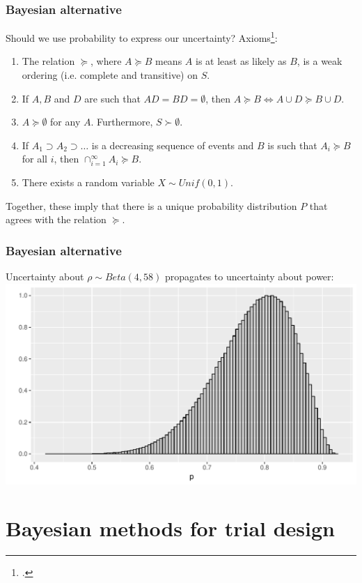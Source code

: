 \documentclass{beamer}
\begin{document}
\begin{frame}
\frametitle{Bayesian alternative}
Should we use probability to express our uncertainty? Axioms\footcite{DeGroot1970}:
\begin{enumerate}
\item The relation $\succeq$, where $A \succeq B$ means $A$ is at least as likely as $B$, is a weak ordering (i.e. complete and transitive) on $S$.
\item If $A, B$ and $D$ are such that $AD = BD = \emptyset$, then $A \succeq B \Longleftrightarrow A \cup D \succeq B \cup D$.
\item $A \succeq \emptyset$ for any $A$. Furthermore, $S \succ \emptyset$.
\item If $A_{1} \supset A_{2} \supset \ldots$ is a decreasing sequence of events and $B$ is such that $A_{i} \succeq B$ for all $i$, then $\cap_{i=1}^{\infty} A_{i} \succeq B$.
\item There exists a random variable $X \sim Unif(0, 1)$.
\end{enumerate}
Together, these imply that there is a unique probability distribution $P$ that agrees with the relation $\succeq$.
\end{frame}

\begin{frame}
\frametitle{Bayesian alternative}
Uncertainty about $\rho \sim Beta(4, 58)$ propagates to uncertainty about power:\\
\vspace{3mm}
\includegraphics[scale=0.5]{prior_power}
\end{frame}

\section{Bayesian methods for trial design}
\end{document}
